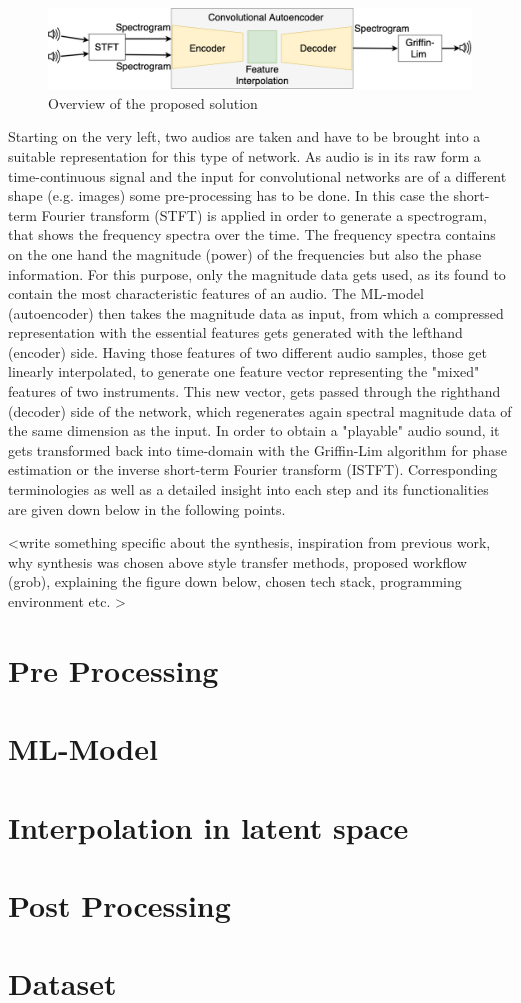  \begin{figure}[htb!]
	\caption{Overview of the proposed solution}
	\label{fig:toolchain}
	\centering
	\includegraphics[width=\textwidth]{images/approach/Toolchain.png}
\end{figure}

Starting on the very left, two audios are taken and have to be brought into a suitable representation for this type of network. As audio is in its raw form a time-continuous signal and the input for convolutional networks are of a different shape (e.g. images) some pre-processing has to be done. In this case the short-term Fourier transform (STFT) is applied in order to generate a spectrogram, that shows the frequency spectra over the time. The frequency spectra contains on the one hand the magnitude (power) of the frequencies but also the phase information. For this purpose, only the magnitude data gets used, as its found to contain the most characteristic features of an audio. The ML-model (autoencoder) then takes the magnitude data as input, from which a compressed representation with the essential features gets generated with the lefthand (encoder) side. Having those features of two different audio samples, those get linearly interpolated, to generate one feature vector representing the "mixed" features of two instruments. This new vector, gets passed through the righthand (decoder) side of the network, which regenerates again spectral magnitude data of the same dimension as the input. In order to obtain a "playable" audio sound, it gets transformed back into time-domain with the Griffin-Lim algorithm \cite{Griffin1984} for phase estimation or the inverse short-term Fourier transform (ISTFT). Corresponding terminologies as well as a detailed insight into each step and its functionalities are given down below in the following points. 


<write something specific about the synthesis, inspiration from previous work, why synthesis was chosen above style transfer methods, proposed workflow (grob), explaining the figure down below, chosen tech stack, programming environment etc. >


\section{Pre Processing}
\label{sec:app_pre-processing}

\section{ML-Model}

\section{Interpolation in latent space}

\section{Post Processing}

\section{Dataset}